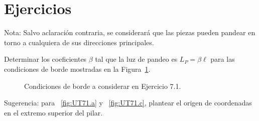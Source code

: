 



\newpage

\section{Ejercicios}
\setcounter{ejercicio}{0}

Nota: Salvo aclaración contraria, se considerará que las piezas pueden pandear en torno a cualquiera de sus direcciones principales.

\ejercicio 

Determinar los coeficientes $\beta$ tal que la luz de pandeo es $L_P=\beta\ell$ para las condiciones de borde mostradas en la Figura~\ref{fig:UT71}.

\begin{figure}[htb]
	\centering
	\subfloat[]{
		\texttt{[image: UT7ej1-a]}
		\label{fig:UT71.a}}
	\hspace{0.1\textwidth}
	\subfloat[]{
		\texttt{[image: UT7ej1-b]}
		\label{fig:UT71.b}}
	\hspace{0.1\textwidth}
	\subfloat[]{
		\texttt{[image: UT7ej1-c]}
		\label{fig:UT71.c}}
	\caption{Condiciones de borde a considerar en Ejercicio 7.1.}
	\label{fig:UT71}
\end{figure}

Sugerencia: para ~\ref{fig:UT71.a} y ~\ref{fig:UT71.c}, plantear el origen de coordenadas en el extremo superior del pilar.

%
%


